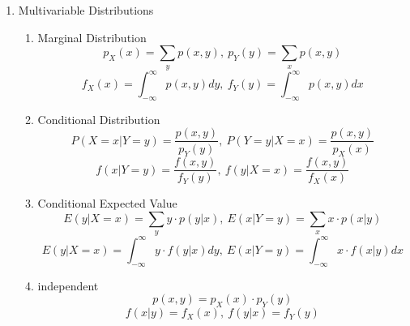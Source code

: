 \documentclass[10pt]{article}
\begin{document}
\begin{multicols}{2}
\begin{enumerate}
\begin{align*}
				F_Y(y) &= P(Y\le y)\\
				&= P(Y\le y)\\
				&= P(g(X) \le y)\\
				&= P[X \le h(y)]\\
				&= F_X(h(y))
			\end{align*}
			Find the density function by differentiating
			\begin{align*}
				f_Y(y) &= \frac{d}{dy}F_X(h(y))\\
				&= \frac{d}{dx}F_X(h(y))\frac{dy}{dx}\\
				&= \frac{d}{dx}F_X(h(y))h'(y)
			\end{align*}
			2. $g(x)$ is strictly decreasing on the sample space for X\\
			Let $h(y)$ be the inverse function of $g(x)$. $h(x)$ is also strictly decreasing.\\
			\begin{align*}
				F_Y(y) &= P(Y\le y)\\
				&= P(Y\le y)\\
				&= P(g(X) \le y)\\
				&= P[X \ge h(y)]\\
				&= 1 - F_X(h(y))
			\end{align*}
			Find the density function by differentiating
			\begin{align*}
				f_Y(y) &= \frac{d}{dy}[1-F_X(h(y))]\\
				&= -\frac{d}{dx}F_X(h(y))\frac{dy}{dx}\\
				&= -\frac{d}{dx}F_X(h(y))h'(y)
			\end{align*}
			IN ALL:\\
			Density function for $Y = g(X)$\\
			Let g(x) be strictly decreasing or increasing on the domain consisting of the sample space. Then:
			$$f_Y(y) = \frac{d}{dx}F_X(h(y)) \cdot |h'(y)|$$
			\item Multivariable Distributions
			\begin{enumerate}
				\item Marginal Distribution\\
				$$p_X(x)=\sum_{y}p(x,y), \ p_Y(y)=\sum_{x}p(x,y) $$
				$$f_X(x) = \int_{-\infty}^{\infty}p(x,y)dy, \ f_Y(y) = \int_{-\infty}^{\infty}p(x,y)dx$$
				\item Conditional Distribution\\
				$$P(X = x|Y = y) = \frac{p(x,y)}{p_Y(y)}, \ P(Y = y|X = x) = \frac{p(x,y)}{p_X(x)}$$
				$$f(x|Y=y)=\frac{f(x,y)}{f_Y(y)}, \ f(y|X=x)=\frac{f(x,y)}{f_X(x)}$$
				\item Conditional Expected Value\\
				$$E(y|X=x) = \sum_{y}y\cdot p(y|x), \ E(x|Y=y) = \sum_{x}x\cdot p(x|y)$$
				$$E(y|X=x) = \int_{-\infty}^{\infty}y\cdot f(y|x)dy, \ E(x|Y=y) = \int_{-\infty}^{\infty}x\cdot f(x|y)dx$$
				\item independent
				$$p(x,y) = p_X(x) \cdot p_Y(y)$$
				$$f(x|y) = f_X(x), \ f(y|x) = f_Y(y)$$
			\end{enumerate}
		\end{enumerate}
	\newpage
	\end{multicols}
\end{document}
